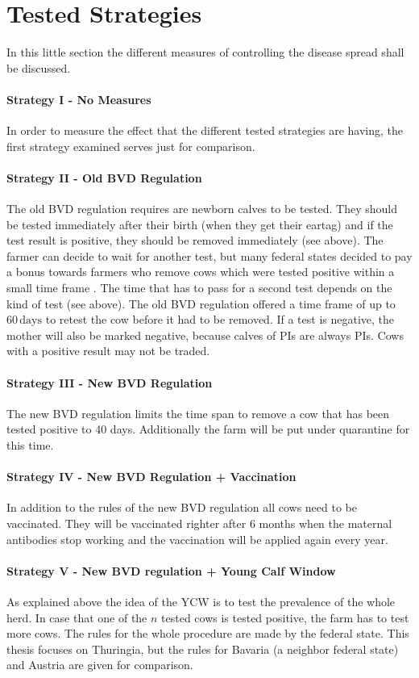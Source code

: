\section{Tested Strategies}\label{chap:testedStrategiesDesc}
In this little section the different measures of controlling the disease spread shall be discussed.
\paragraph{Strategy I - No Measures}
In order to measure the effect that the different tested strategies are having, the first strategy examined serves just for comparison.
\paragraph{Strategy II - Old BVD Regulation}
The old BVD regulation requires are newborn calves to be tested. They should be tested immediately after their birth (when they get their eartag) and if the test result is positive, they should be removed immediately (see above). The farmer can decide to wait for another test, but many federal states decided to pay a bonus towards farmers who remove cows which were tested positive within a small time frame \citep{personalCom}. The time that has to pass for a second test depends on the kind of test (see above). The old BVD regulation offered a time frame of up to $60\,\text{days}$ to retest the cow before it had to be removed. 
If a test is negative, the mother will also be marked negative, because calves of PIs are always PIs. Cows with a positive result may not be traded.
\paragraph{Strategy III - New BVD Regulation}
The new BVD regulation limits the time span to remove a cow that has been tested positive to 40 days. Additionally the farm will be put under quarantine for this time. 
\paragraph{Strategy IV - New BVD Regulation + Vaccination}
In addition to the rules of the new BVD regulation all cows need to be vaccinated. They will be vaccinated righter after 6 months when the maternal antibodies stop working and the vaccination will be applied again every year. 
\paragraph{Strategy V - New BVD regulation + Young Calf Window}
As explained above the idea of the YCW is to test the prevalence of the whole herd. In case that one of the $n$ tested cows is tested positive, the farm has to test more cows. The rules for the whole procedure are made by the federal state. This thesis focuses on Thuringia, but the rules for Bavaria (a neighbor federal state) and Austria are given for comparison.
